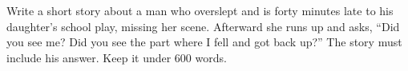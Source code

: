 Write a short story about a man who overslept and is forty minutes late to his daughter's school play, missing her scene. Afterward she runs up and asks, ``Did you see me? Did you see the part where I fell and got back up?'' The story must include his answer. Keep it under 600 words.
